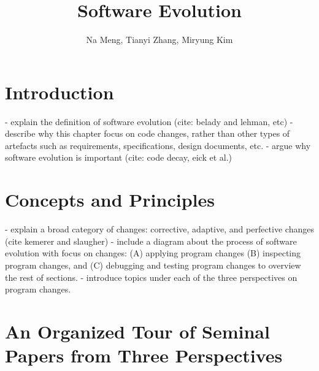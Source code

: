 \documentclass[runningheads,a4paper]{llncs}
\begin{document}
\mainmatter  %

\title{Software Evolution} 


%
%
\author{Na Meng, Tianyi Zhang, Miryung Kim} 



\maketitle


\begin{abstract}
\end{abstract}


\section{Introduction}
- explain the definition of software evolution (cite: belady and lehman, etc)
- describe why this chapter focus on code changes, rather than other types of artefacts such as requirements, specifications, design documents, etc. 
- argue why software evolution is important (cite: code decay, eick et al.) 

\section{Concepts and Principles}
- explain a broad category of changes: corrective, adaptive, and perfective changes (cite kemerer and slaugher)  
- include a diagram about the process of software evolution with focus on changes: (A) applying program changes (B) inspecting program changes, and (C) debugging and testing program changes to overview the rest of sections.  
- introduce topics under each of the three perspectives on program changes. 

\section{An Organized Tour of Seminal Papers from Three Perspectives} 
\end{document}
